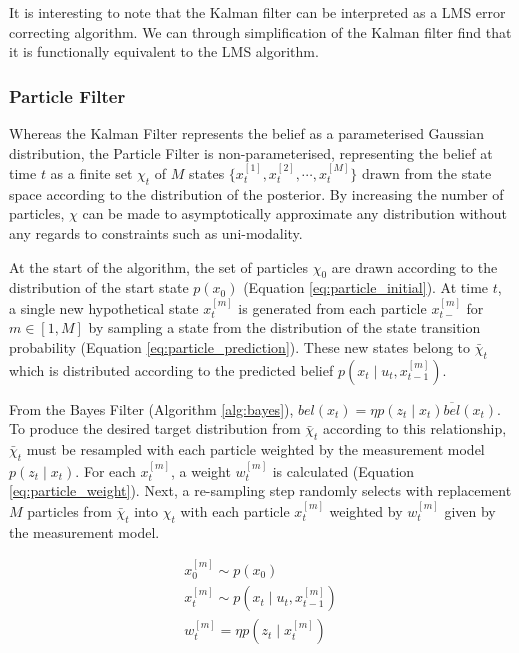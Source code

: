 \documentclass[english]{article}
\begin{document}
It is interesting to note that the Kalman filter can be interpreted as a LMS error correcting algorithm. We can through simplification of the Kalman filter find that it is functionally equivalent to the LMS algorithm.

\subsubsection{Particle Filter}

Whereas the Kalman Filter represents the belief as a parameterised Gaussian distribution, the Particle Filter is non-parameterised, representing the belief at time $t$ as a finite set $\chi_t$ of $M$ states $\{x^{[1]}_t, x^{[2]}_t, \cdots , x^{[M]}_t\}$ drawn from the state space according to the distribution of the posterior. By increasing the number of particles, $\chi$ can be made to asymptotically approximate any distribution without any regards to constraints such as uni-modality\cite{Thrun02d}.

At the start of the algorithm, the set of particles $\chi_0$ are drawn according to the distribution of the start state $p(x_0)$ (Equation \ref{eq:particle_initial}). At time $t$, a single new hypothetical state $x^{[m]}_t$ is generated from each particle $x^{[m]}_{t-}$ for $m \in [1,M]$ by sampling a state from the distribution of the state transition probability (Equation \ref{eq:particle_prediction}). These new states belong to $\bar{\chi}_t$ which is distributed according to the predicted belief $p(x_t \mid u_t,x^{[m]}_{t-1})$.

From the Bayes Filter (Algorithm \ref{alg:bayes}), $bel(x_t) = \eta p(z_t \mid x_t) \overline{bel}(x_t)$. To produce the desired target distribution from $\bar{\chi}_t$ according to this relationship, $\bar{\chi}_t$ must be resampled with each particle weighted by the measurement model $p(z_t \mid x_t)$. For each $x^{[m]}_{t}$, a weight $w^{[m]}_t$ is calculated (Equation \ref{eq:particle_weight}). Next, a re-sampling step randomly selects with replacement $M$ particles from $\bar{\chi}_t$ into $\chi_t$ with each particle $x^{[m]}_{t}$ weighted by $w^{[m]}_t$ given by the measurement model\cite{probrob}.

\begin {align}
  x^{[m]}_0 \sim  p(x_0) \label{eq:particle_initial}\\
  x^{[m]}_t \sim p(x_t \mid u_t,x^{[m]}_{t-1}) \label{eq:particle_prediction} \\
  w^{[m]}_t = \eta p(z_t \mid x^{[m]}_t) \label{eq:particle_weight}
\end {align}
\end{document}
